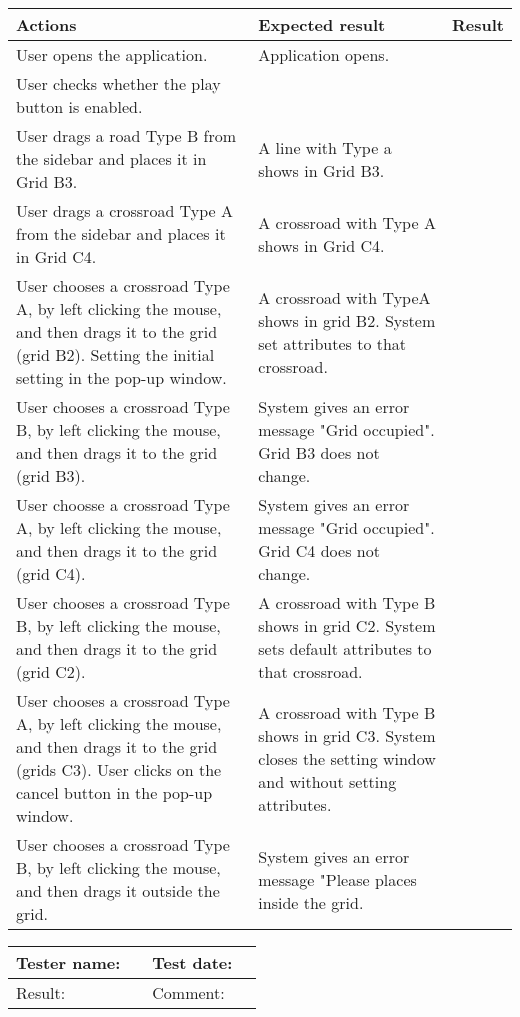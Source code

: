 	\begin{tabularx}{\textwidth}{|X|X|p{2.5cm}|}\hline
		Actions & Expected result & Result \\\hline
		User opens the application.& Application opens. &  \pass \\\hline
		User checks whether the play button is enabled. & &  \pass \\\hline
		User drags a road Type B from the sidebar and places it in Grid B3. & A line with Type a shows in Grid B3. & \pass \\\hline
		User drags a crossroad Type A from the sidebar and places it in Grid C4. & A crossroad with Type A shows in Grid C4. & \pass \\\hline
		User chooses a crossroad Type A, by left clicking the mouse, and then drags it to the grid (grid B2). Setting the initial setting in the pop-up window. & A crossroad with TypeA shows in grid B2. System set attributes to that crossroad. & \pass \\\hline
		User chooses a crossroad Type B, by left clicking the mouse, and then drags it to the grid (grid B3). & System gives an  error message "Grid occupied". Grid B3 does not change. & \pass\\\hline
		User choosse a crossroad Type A, by left clicking the mouse, and then drags it to the grid (grid C4). & System gives an  error message "Grid occupied". Grid C4 does not change. & \pass\\\hline
	    User chooses a crossroad Type B, by left clicking the mouse, and then drags it to the grid (grid C2). & A crossroad with Type B shows in grid C2. System sets default attributes to that crossroad. & \pass\\\hline
	    User chooses a crossroad Type A, by left clicking the mouse, and then drags it to the grid (grids C3). User clicks on the cancel button in the pop-up window. & A crossroad with Type B shows in grid C3. System closes the setting window and without setting attributes. & \pass\\\hline
	    User chooses a crossroad Type B, by left clicking the mouse, and then drags it outside the grid.& System gives an error message "Please places inside the grid. & \pass\\\hline
	     
	\end{tabularx}


\begin{tabularx}{\textwidth}{|p{3cm}X|p{3cm}X|}\hline
	Tester name: &  & Test date: & \\\hline
	Result: &   \pass & Comment: & \\\hline
\end{tabularx}

